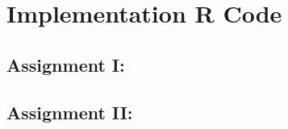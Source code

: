 \documentclass[12pt]{article}
\begin{document}
\newpage
\appendix
\section{Implementation R Code}
\subsection{Assignment I:}
\label{1:gua}

\label{1:para}

\label{1:nopara}

\label{1:BK7}

\subsection{Assignment II: }

\end{document}
